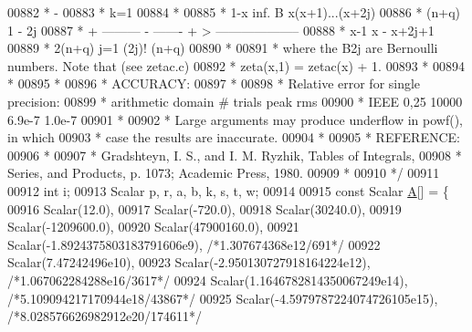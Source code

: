 \begin{DoxyCode}
00882 \textcolor{comment}{         *                -}
00883 \textcolor{comment}{         *               k=1}
00884 \textcolor{comment}{         *}
00885 \textcolor{comment}{         *           1-x                 inf.  B   x(x+1)...(x+2j)}
00886 \textcolor{comment}{         *      (n+q)           1         -     2j}
00887 \textcolor{comment}{         *  +  ---------  -  -------  +   >    --------------------}
00888 \textcolor{comment}{         *        x-1              x      -                   x+2j+1}
00889 \textcolor{comment}{         *                   2(n+q)      j=1       (2j)! (n+q)}
00890 \textcolor{comment}{         *}
00891 \textcolor{comment}{         * where the B2j are Bernoulli numbers.  Note that (see zetac.c)}
00892 \textcolor{comment}{         * zeta(x,1) = zetac(x) + 1.}
00893 \textcolor{comment}{         *}
00894 \textcolor{comment}{         *}
00895 \textcolor{comment}{         *}
00896 \textcolor{comment}{         * ACCURACY:}
00897 \textcolor{comment}{         *}
00898 \textcolor{comment}{         * Relative error for single precision:}
00899 \textcolor{comment}{         * arithmetic   domain     # trials      peak         rms}
00900 \textcolor{comment}{         *    IEEE      0,25        10000       6.9e-7      1.0e-7}
00901 \textcolor{comment}{         *}
00902 \textcolor{comment}{         * Large arguments may produce underflow in powf(), in which}
00903 \textcolor{comment}{         * case the results are inaccurate.}
00904 \textcolor{comment}{         *}
00905 \textcolor{comment}{         * REFERENCE:}
00906 \textcolor{comment}{         *}
00907 \textcolor{comment}{         * Gradshteyn, I. S., and I. M. Ryzhik, Tables of Integrals,}
00908 \textcolor{comment}{         * Series, and Products, p. 1073; Academic Press, 1980.}
00909 \textcolor{comment}{         *}
00910 \textcolor{comment}{         */}
00911 
00912         \textcolor{keywordtype}{int} i;
00913         Scalar p, r, a, b, k, s, t, w;
00914 
00915         \textcolor{keyword}{const} Scalar \hyperlink{group___core___module_class_eigen_1_1_matrix}{A}[] = \{
00916             Scalar(12.0),
00917             Scalar(-720.0),
00918             Scalar(30240.0),
00919             Scalar(-1209600.0),
00920             Scalar(47900160.0),
00921             Scalar(-1.8924375803183791606e9), \textcolor{comment}{/*1.307674368e12/691*/}
00922             Scalar(7.47242496e10),
00923             Scalar(-2.950130727918164224e12), \textcolor{comment}{/*1.067062284288e16/3617*/}
00924             Scalar(1.1646782814350067249e14), \textcolor{comment}{/*5.109094217170944e18/43867*/}
00925             Scalar(-4.5979787224074726105e15), \textcolor{comment}{/*8.028576626982912e20/174611*/}

\end{DoxyCode}
